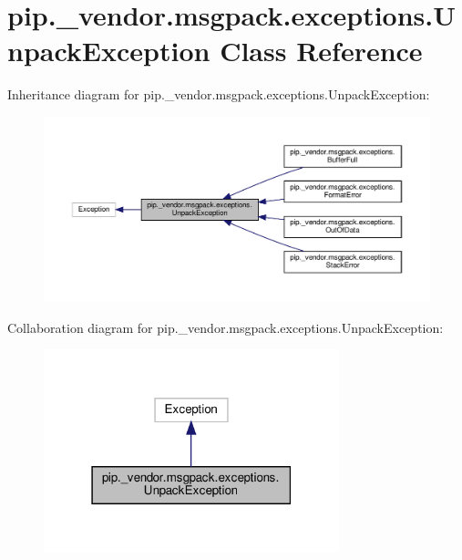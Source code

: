 \hypertarget{classpip_1_1__vendor_1_1msgpack_1_1exceptions_1_1UnpackException}{}\section{pip.\+\_\+vendor.\+msgpack.\+exceptions.\+Unpack\+Exception Class Reference}
\label{classpip_1_1__vendor_1_1msgpack_1_1exceptions_1_1UnpackException}


Inheritance diagram for pip.\+\_\+vendor.\+msgpack.\+exceptions.\+Unpack\+Exception\+:
\nopagebreak
\begin{figure}[H]
\begin{center}
\leavevmode
\includegraphics[width=350pt]{classpip_1_1__vendor_1_1msgpack_1_1exceptions_1_1UnpackException__inherit__graph}
\end{center}
\end{figure}


Collaboration diagram for pip.\+\_\+vendor.\+msgpack.\+exceptions.\+Unpack\+Exception\+:
\nopagebreak
\begin{figure}[H]
\begin{center}
\leavevmode
\includegraphics[width=243pt]{classpip_1_1__vendor_1_1msgpack_1_1exceptions_1_1UnpackException__coll__graph}
\end{center}
\end{figure}


